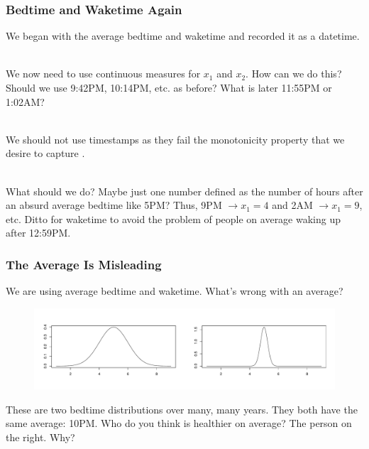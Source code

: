\documentclass[slides]{beamer} %
\begin{document}
\begin{frame}\frametitle{Bedtime and Waketime Again}

We began with the average bedtime and waketime and recorded it as a datetime.\\~\\ \pause 

We now need to use continuous measures for $x_1$ and $x_2$. How can we do this? Should we use 9:42PM, 10:14PM, etc. as before? What is later 11:55PM or 1:02AM?\\~\\ \pause 

We should not use timestamps as they fail the monotonicity property that we desire to capture .\\~\\ \pause 

What should we do? Maybe just one number defined as the number of hours after an absurd average bedtime like 5PM? Thus, 9PM $\rightarrow x_1 = 4$ and 2AM $\rightarrow x_1 = 9$, etc. Ditto for waketime to avoid the problem of people on average waking up after 12:59PM.
	
\end{frame}

\begin{frame}\frametitle{The Average Is Misleading}

We are using average bedtime and waketime. What's wrong with an average?

\begin{figure}
\centering
\includegraphics[width=4.5in]{two_dist}
\end{figure}

%
	
These are two bedtime distributions over many, many years. They both have the same average: 10PM. Who do you think is healthier on average?  \pause The person on the right. Why?
\end{frame}
\end{document}
